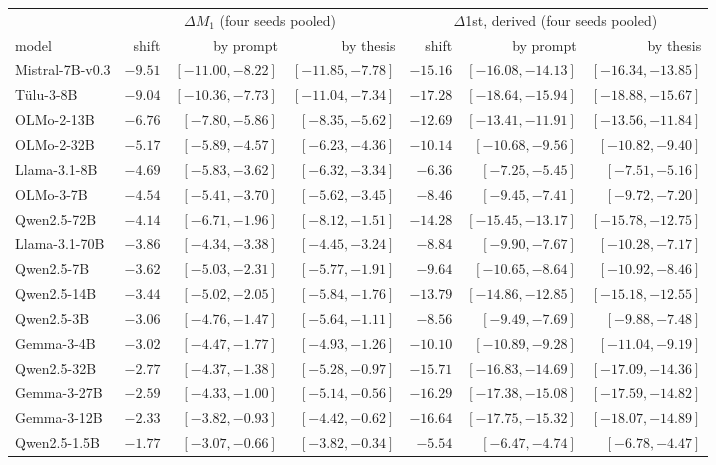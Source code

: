 \begin{center}\scriptsize\setlength{\tabcolsep}{4pt}
\begin{tabular}{lrrrrrr}\toprule
 & \multicolumn{3}{c}{$\Delta M_1$ (four seeds pooled)} & \multicolumn{3}{c}{$\Delta$1st, derived (four seeds pooled)} \\
\cmidrule(lr){2-4}\cmidrule(lr){5-7}
model & shift & by prompt & by thesis & shift & by prompt & by thesis \\ \midrule
Mistral-7B-v0.3 & $-9.51$ & $[-11.00,-8.22]$ & $[-11.85,-7.78]$ & $-15.16$ & $[-16.08,-14.13]$ & $[-16.34,-13.85]$ \\
T\"ulu-3-8B & $-9.04$ & $[-10.36,-7.73]$ & $[-11.04,-7.34]$ & $-17.28$ & $[-18.64,-15.94]$ & $[-18.88,-15.67]$ \\
OLMo-2-13B & $-6.76$ & $[-7.80,-5.86]$ & $[-8.35,-5.62]$ & $-12.69$ & $[-13.41,-11.91]$ & $[-13.56,-11.84]$ \\
OLMo-2-32B & $-5.17$ & $[-5.89,-4.57]$ & $[-6.23,-4.36]$ & $-10.14$ & $[-10.68,-9.56]$ & $[-10.82,-9.40]$ \\
Llama-3.1-8B & $-4.69$ & $[-5.83,-3.62]$ & $[-6.32,-3.34]$ & $-6.36$ & $[-7.25,-5.45]$ & $[-7.51,-5.16]$ \\
OLMo-3-7B & $-4.54$ & $[-5.41,-3.70]$ & $[-5.62,-3.45]$ & $-8.46$ & $[-9.45,-7.41]$ & $[-9.72,-7.20]$ \\
Qwen2.5-72B & $-4.14$ & $[-6.71,-1.96]$ & $[-8.12,-1.51]$ & $-14.28$ & $[-15.45,-13.17]$ & $[-15.78,-12.75]$ \\
Llama-3.1-70B & $-3.86$ & $[-4.34,-3.38]$ & $[-4.45,-3.24]$ & $-8.84$ & $[-9.90,-7.67]$ & $[-10.28,-7.17]$ \\
Qwen2.5-7B & $-3.62$ & $[-5.03,-2.31]$ & $[-5.77,-1.91]$ & $-9.64$ & $[-10.65,-8.64]$ & $[-10.92,-8.46]$ \\
Qwen2.5-14B & $-3.44$ & $[-5.02,-2.05]$ & $[-5.84,-1.76]$ & $-13.79$ & $[-14.86,-12.85]$ & $[-15.18,-12.55]$ \\
Qwen2.5-3B & $-3.06$ & $[-4.76,-1.47]$ & $[-5.64,-1.11]$ & $-8.56$ & $[-9.49,-7.69]$ & $[-9.88,-7.48]$ \\
Gemma-3-4B & $-3.02$ & $[-4.47,-1.77]$ & $[-4.93,-1.26]$ & $-10.10$ & $[-10.89,-9.28]$ & $[-11.04,-9.19]$ \\
Qwen2.5-32B & $-2.77$ & $[-4.37,-1.38]$ & $[-5.28,-0.97]$ & $-15.71$ & $[-16.83,-14.69]$ & $[-17.09,-14.36]$ \\
Gemma-3-27B & $-2.59$ & $[-4.33,-1.00]$ & $[-5.14,-0.56]$ & $-16.29$ & $[-17.38,-15.08]$ & $[-17.59,-14.82]$ \\
Gemma-3-12B & $-2.33$ & $[-3.82,-0.93]$ & $[-4.42,-0.62]$ & $-16.64$ & $[-17.75,-15.32]$ & $[-18.07,-14.89]$ \\
Qwen2.5-1.5B & $-1.77$ & $[-3.07,-0.66]$ & $[-3.82,-0.34]$ & $-5.54$ & $[-6.47,-4.74]$ & $[-6.78,-4.47]$ \\
\bottomrule\end{tabular}\end{center}
